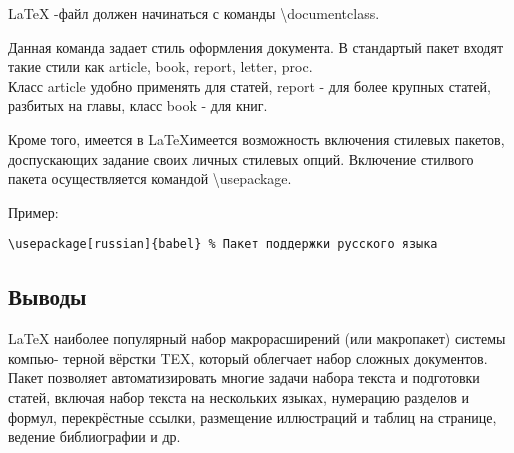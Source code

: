 \documentclass[a4paper, 12pt]{article}
\begin{document}
\LaTeX{} -файл должен начинаться с команды \textbackslash documentclass. 

Данная команда задает стиль оформления документа. В стандартый пакет входят такие стили как article, book, report, letter, proc. \\
Класс article удобно применять для статей, report - для более крупных статей, разбитых на главы, класс book - для книг.

Кроме того, имеется в \LaTeX имеется возможность включения стилевых пакетов, доспускающих задание своих личных стилевых опций. Включение стилвого пакета осуществляется командой \textbackslash usepackage.

Пример:

\begin{verbatim}
\usepackage[russian]{babel} % Пакет поддержки русского языка
\end{verbatim}

\subsection{Выводы}

\LaTeX{} наиболее популярный набор макрорасширений (или макропакет) системы компью-
терной вёрстки TEX, который облегчает набор сложных документов.
Пакет позволяет автоматизировать многие задачи набора текста и подготовки статей,
включая набор текста на нескольких языках, нумерацию разделов и формул, перекрёстные
ссылки, размещение иллюстраций и таблиц на странице, ведение библиографии и др.
\end{document}
